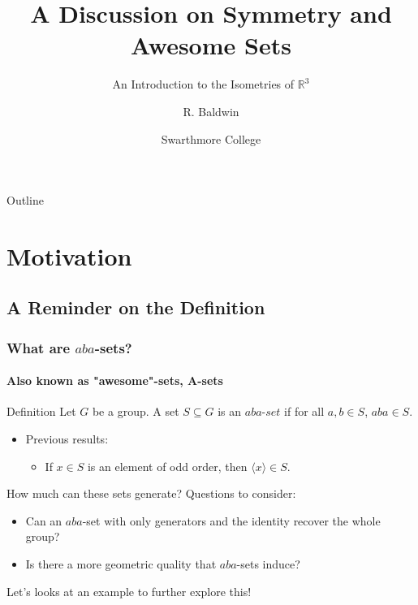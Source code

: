\documentclass{beamer}
\title[A Discussion on Symmetry and Awesome Sets] %
{A Discussion on Symmetry and Awesome Sets}
\subtitle
{An Introduction to the Isometries of \texorpdfstring{$\mathbb{R}^3$}{R3}}
\author[Ryan Baldwin] %
{R. Baldwin}
\institute[Swarthmore College] %
{
  \inst{}%
  Math/Stat Department\\
  Swarthmore College
}
\date[CFP 2025] %
{Swarthmore College}
\begin{document}
\begin{frame}
  \titlepage
\end{frame}

\begin{frame}{Outline}
  \tableofcontents
\end{frame}

\section{Motivation}

\subsection{A Reminder on the Definition}

\begin{frame}
  \frametitle{What are $aba$-sets?}
  \framesubtitle{Also known as "awesome"-sets, A-sets}

  \begin{alertblock}{Definition}
     Let $G$ be a group. \newline
     A set $S \subseteq G$ is an $aba$-$set$ if for all $a,b \in S$, $aba \in S$.
  \end{alertblock}

  \begin{itemize}
  \item Previous results:
  \begin{itemize}
  
  \pause  
  \item If $x \in S$ is an element of odd order, then $\langle x \rangle \in S$.
  \end{itemize}
  \end{itemize}
\end{frame}

\begin{frame}{How much can these sets generate?}
  Questions to consider:

  \begin{itemize}
  \pause
  \item Can an $aba$-set with only generators and the identity recover the whole group?
  \pause
  \item Is there a more geometric quality that $aba$-sets induce?\newline
  \end{itemize}

  \pause
  Let's looks at an example to further explore this!
\end{frame}
\end{document}
